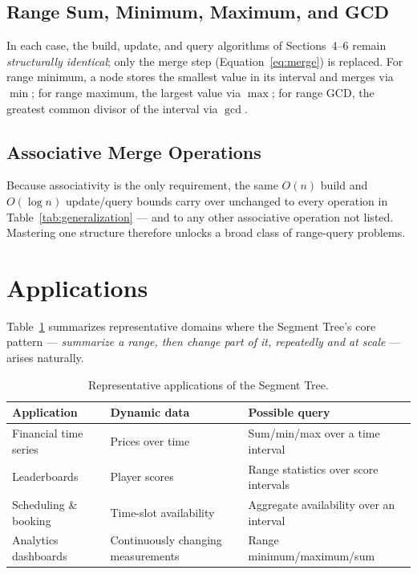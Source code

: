 \documentclass[11pt]{article}
\begin{document}
\subsection{Range Sum, Minimum, Maximum, and GCD}
In each case, the build, update, and query algorithms of Sections~4--6 remain \emph{structurally identical}; only the merge step (Equation~\eqref{eq:merge}) is replaced. For range minimum, a node stores the smallest value in its interval and merges via $\min$; for range maximum, the largest value via $\max$; for range GCD, the greatest common divisor of the interval via $\gcd$.

\subsection{Associative Merge Operations}
Because associativity is the only requirement, the same $O(n)$ build and $O(\log n)$ update/query bounds carry over unchanged to every operation in Table~\ref{tab:generalization} --- and to any other associative operation not listed. Mastering one structure therefore unlocks a broad class of range-query problems.

\section{Applications}

Table~\ref{tab:applications} summarizes representative domains where the Segment Tree's core pattern --- \emph{summarize a range, then change part of it, repeatedly and at scale} --- arises naturally.

\begin{table}[h]
\centering
\caption{Representative applications of the Segment Tree.}
\label{tab:applications}
\begin{tabular}{p{3.1cm}p{4.3cm}p{5.3cm}}
\toprule
\textbf{Application} & \textbf{Dynamic data} & \textbf{Possible query} \\
\midrule
Financial time series & Prices over time & Sum/min/max over a time interval \\
Leaderboards & Player scores & Range statistics over score intervals \\
Scheduling \& booking & Time-slot availability & Aggregate availability over an interval \\
Analytics dashboards & Continuously changing measurements & Range minimum/maximum/sum \\
\bottomrule
\end{tabular}
\end{table}
\end{document}
